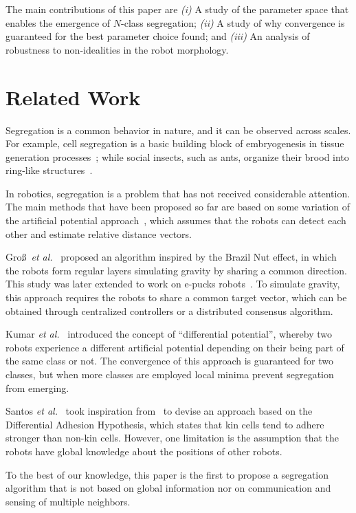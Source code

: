 \documentclass[letterpaper, 10 pt, conference]{ieeeconf}
\begin{document}
The main contributions of this paper are \emph{(i)} A study of the parameter
space that enables the emergence of $N$-class segregation; \emph{(ii)} A study
of why convergence is guaranteed for the best parameter choice found; and
\emph{(iii)} An analysis of robustness to non-idealities in the robot
morphology.

\section{Related Work}
Segregation is a common behavior in nature, and it can be observed across
scales. For example, cell segregation is a basic building block of embryogenesis
in tissue generation processes~\cite{batlle_molecular_2012,Steinberg1963}; while
social insects, such as ants, organize their brood into ring-like
structures~\cite{Franks1992}.

In robotics, segregation is a problem that has not received considerable
attention. The main methods that have been proposed so far are based on some
variation of the artificial potential approach~\cite{Spears2004}, which assumes
that the robots can detect each other and estimate relative distance vectors.

Gro\ss~\emph{et al.}~\cite{gross_segregation_2009} proposed an
algorithm inspired by the Brazil Nut effect, in which the robots form regular
layers simulating gravity by sharing a common direction. This study was later
extended to work on e-pucks robots~\cite{Chen2012}. To simulate gravity, this
approach requires the robots to share a common target vector, which can be
obtained through centralized controllers or a distributed consensus algorithm.

Kumar \emph{et al.}~\cite{kumar_segregation_2010} introduced the concept of
``differential potential'', whereby two robots experience a different artificial
potential depending on their being part of the same class or not. The
convergence of this approach is guaranteed for two classes, but when more
classes are employed local minima prevent segregation from emerging.

Santos \emph{et al.}~\cite{santos_segregation_2014} took inspiration
from~\cite{kumar_segregation_2010} to devise an approach based on the
Differential Adhesion Hypothesis, which states that kin cells tend to adhere
stronger than non-kin cells. However, one limitation is the assumption
that the robots have global knowledge about the positions of other robots.

To the best of our knowledge, this paper is the first to propose a segregation
algorithm that is not based on global information nor on communication and
sensing of multiple neighbors.
\end{document}
